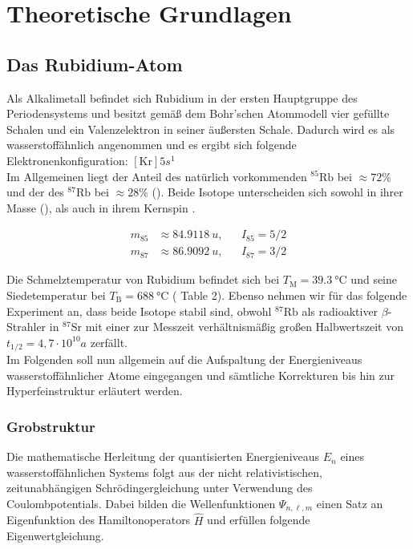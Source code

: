 \chapter{Theoretische Grundlagen}
\label{chap:theoretical-basics}

\section{Das Rubidium-Atom}

\noindent Als Alkalimetall befindet sich Rubidium  in der ersten Hauptgruppe des Periodensystems und besitzt gemäß dem Bohr'schen Atommodell vier gefüllte Schalen und ein Valenzelektron in seiner äußersten Schale. Dadurch wird es als wasserstoffähnlich angenommen und es ergibt sich folgende Elektronenkonfiguration: $[\text{Kr}]5s^{1}$\\
\noindent Im Allgemeinen liegt der Anteil des natürlich vorkommenden $^{85}\text{Rb}$ bei $\approx72\%$ und der des $^{87}\text{Rb}$ bei $\approx28\%$ (\cite[S. ]{H2}). Beide Isotope unterscheiden sich sowohl in ihrer Masse (\cite{MassRb}), als auch in ihrem Kernspin \cite{H2}.

\begin{align}
    m_{85} & \approx \SI{84,9118}{u}, && I_{85} = 5/2 \\
    m_{87} & \approx \SI{86,9092}{u}, && I_{87} = 3/2 
\end{align}

\noindent Die Schmelztemperatur von Rubidium befindet sich bei $T_{\text{M}} = \SI{39,3}{\celsius}$ und seine Siedetemperatur bei $T_{\text{B}} = \SI{688}{\celsius}$ (\cite{Steck85} Table 2). Ebenso nehmen wir für das folgende Experiment an, dass beide Isotope stabil sind, obwohl $^{87}\text{Rb}$ als radioaktiver $\beta$-Strahler in $^{87}\text{Sr}$ mit einer zur Messzeit verhältnismäßig großen Halbwertszeit von ${t_{1/2}}= 4,7 \cdot 10^{10}a$ zerfällt. \cite{HWZ}\\

\noindent Im Folgenden soll nun allgemein auf die Aufspaltung der Energieniveaus wasserstoffähnlicher Atome eingegangen und sämtliche Korrekturen bis hin zur Hyperfeinstruktur erläutert werden.

\subsection{Grobstruktur}

\noindent Die mathematische Herleitung der quantisierten Energieniveaus ${E_{n}}$ eines wasserstoffähnlichen Systems folgt aus der nicht relativistischen, zeitunabhängigen Schrödingergleichung unter Verwendung des Coulombpotentials. Dabei bilden die Wellenfunktionen $\Psi_{n,\ell,m}$ einen Satz an Eigenfunktion des Hamiltonoperators $\hat{H}$ und erfüllen folgende Eigenwertgleichung.


